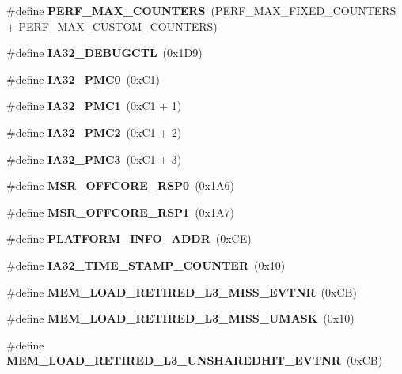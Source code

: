 \begin{DoxyCompactItemize}
\item 
\mbox{\label{types_8h_aed6a86fa515f9e1e01b1809c1d9ecb29}} 
\#define {\bfseries P\+E\+R\+F\+\_\+\+M\+A\+X\+\_\+\+C\+O\+U\+N\+T\+E\+RS}~(P\+E\+R\+F\+\_\+\+M\+A\+X\+\_\+\+F\+I\+X\+E\+D\+\_\+\+C\+O\+U\+N\+T\+E\+RS + P\+E\+R\+F\+\_\+\+M\+A\+X\+\_\+\+C\+U\+S\+T\+O\+M\+\_\+\+C\+O\+U\+N\+T\+E\+RS)
\item 
\mbox{\label{types_8h_a6e3807d506c237c1e48f8a1c86568711}} 
\#define {\bfseries I\+A32\+\_\+\+D\+E\+B\+U\+G\+C\+TL}~(0x1\+D9)
\item 
\mbox{\label{types_8h_a4554738d7da6a73d954483b208f81db3}} 
\#define {\bfseries I\+A32\+\_\+\+P\+M\+C0}~(0x\+C1)
\item 
\mbox{\label{types_8h_a8fa283364a2d1104f70d904270883cb2}} 
\#define {\bfseries I\+A32\+\_\+\+P\+M\+C1}~(0x\+C1 + 1)
\item 
\mbox{\label{types_8h_afe3565c403a07374f8d610cdf541baee}} 
\#define {\bfseries I\+A32\+\_\+\+P\+M\+C2}~(0x\+C1 + 2)
\item 
\mbox{\label{types_8h_a5566a7b0fe387bce0c26c686b10461d2}} 
\#define {\bfseries I\+A32\+\_\+\+P\+M\+C3}~(0x\+C1 + 3)
\item 
\mbox{\label{types_8h_a215d0676fd6bdc55c65ea6116919da53}} 
\#define {\bfseries M\+S\+R\+\_\+\+O\+F\+F\+C\+O\+R\+E\+\_\+\+R\+S\+P0}~(0x1\+A6)
\item 
\mbox{\label{types_8h_a78dc77e6b5f300a28990557043f946e2}} 
\#define {\bfseries M\+S\+R\+\_\+\+O\+F\+F\+C\+O\+R\+E\+\_\+\+R\+S\+P1}~(0x1\+A7)
\item 
\mbox{\label{types_8h_a36cfb7e155c237aea26a1a61a08531b4}} 
\#define {\bfseries P\+L\+A\+T\+F\+O\+R\+M\+\_\+\+I\+N\+F\+O\+\_\+\+A\+D\+DR}~(0x\+C\+E)
\item 
\mbox{\label{types_8h_a2f40dbbbfee7082937c1387cf2c34d64}} 
\#define {\bfseries I\+A32\+\_\+\+T\+I\+M\+E\+\_\+\+S\+T\+A\+M\+P\+\_\+\+C\+O\+U\+N\+T\+ER}~(0x10)
\item 
\mbox{\label{types_8h_a11151e507895f0b9fbf12448944361d1}} 
\#define {\bfseries M\+E\+M\+\_\+\+L\+O\+A\+D\+\_\+\+R\+E\+T\+I\+R\+E\+D\+\_\+\+L3\+\_\+\+M\+I\+S\+S\+\_\+\+E\+V\+T\+NR}~(0x\+C\+B)
\item 
\mbox{\label{types_8h_a97de88538de409f371031bd4070e8359}} 
\#define {\bfseries M\+E\+M\+\_\+\+L\+O\+A\+D\+\_\+\+R\+E\+T\+I\+R\+E\+D\+\_\+\+L3\+\_\+\+M\+I\+S\+S\+\_\+\+U\+M\+A\+SK}~(0x10)
\item 
\mbox{\label{types_8h_ac3057c525d05ff1ff3bbc866a6959ef0}} 
\#define {\bfseries M\+E\+M\+\_\+\+L\+O\+A\+D\+\_\+\+R\+E\+T\+I\+R\+E\+D\+\_\+\+L3\+\_\+\+U\+N\+S\+H\+A\+R\+E\+D\+H\+I\+T\+\_\+\+E\+V\+T\+NR}~(0x\+C\+B)

\end{DoxyCompactItemize}

